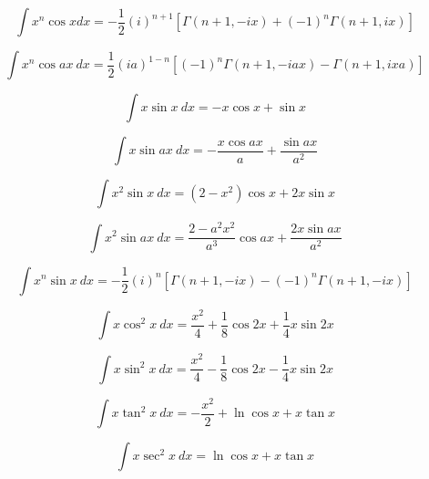 \begin{equation}
\int  x^n \cos x dx = 
-\frac{1}{2}(i)^{n+1}\left [ \Gamma(n+1, -ix) 
+ (-1)^n \Gamma(n+1, ix)\right] 
\end{equation}

\begin{equation}
\int x^n \cos ax \ dx =
 \frac{1}{2}(ia)^{1-n}\left [ (-1)^n  \Gamma(n+1, -iax) 
 -\Gamma(n+1, ixa)\right] 
\end{equation}

\begin{equation}
\int x \sin x\ dx = -x \cos x + \sin x 
\end{equation}

\begin{equation}
\int x \sin ax\ dx = -\frac{x \cos ax}{a} + \frac{\sin ax}{a^2} 
\end{equation}

\begin{equation}
\int x^2 \sin x\ dx = \left(2-x^2\right) \cos x + 2 x \sin x
\end{equation}

\begin{equation}
\int x^2 \sin ax\ dx =\frac{2-a^2x^2}{a^3}\cos ax +\frac{ 2 x \sin ax}{a^2} 
\end{equation}

\begin{equation}\label{eq:xul}
\int x^n \sin x \ dx = -\frac{1}{2}(i)^n\left[ \Gamma(n+1, -ix) 
 - (-1)^n\Gamma(n+1, -ix)\right] 
\end{equation}

\begin{equation}
\int x \cos^2 x \ dx = \frac{x^2}{4}+\frac{1}{8}\cos 2x + \frac{1}{4} x \sin 2x
\end{equation}

\begin{equation}
\int x \sin^2 x \ dx = \frac{x^2}{4}-\frac{1}{8}\cos 2x - \frac{1}{4} x \sin 2x
\end{equation}

\begin{equation}
\int x \tan^2 x \ dx = -\frac{x^2}{2} + \ln \cos x + x \tan x
\end{equation}

\begin{equation}
\int x \sec^2 x \ dx = \ln \cos x + x \tan x
\end{equation}
 
